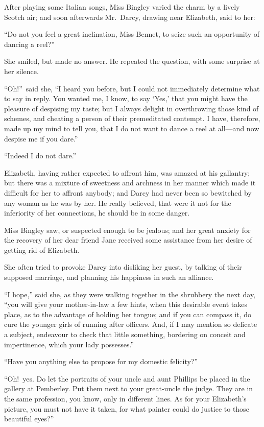 \documentclass[12pt,english]{book}
\begin{document}
After playing some Italian songs, Miss Bingley varied the charm by
a lively Scotch air; and soon afterwards Mr.\ Darcy, drawing near
Elizabeth, said to her:

{}``Do not you feel a great inclination, Miss Bennet, to seize such
an opportunity of dancing a reel?''\ 

She smiled, but made no answer. He repeated the question, with some
surprise at her silence.

{}``Oh!''\ said she, {}``I heard you before, but I could not immediately
determine what to say in reply. You wanted me, I know, to say `Yes,'
that you might have the pleasure of despising my taste; but I always
delight in overthrowing those kind of schemes, and cheating a person
of their premeditated contempt. I have, therefore, made up my mind
to tell you, that I do not want to dance a reel at all\mbox{---}and
now despise me if you dare.''

{}``Indeed I do not dare.''

Elizabeth, having rather expected to affront him, was amazed at his
gallantry; but there was a mixture of sweetness and archness in her
manner which made it difficult for her to affront anybody; and Darcy
had never been so bewitched by any woman as he was by her. He really
believed, that were it not for the inferiority of her connections,
he should be in some danger.

Miss Bingley saw, or suspected enough to be jealous; and her great
anxiety for the recovery of her dear friend Jane received some assistance
from her desire of getting rid of Elizabeth.

She often tried to provoke Darcy into disliking her guest, by talking
of their supposed marriage, and planning his happiness in such an
alliance.

{}``I hope,'' said she, as they were walking together in the shrubbery
the next day, {}``you will give your mother-in-law a few hints, when
this desirable event takes place, as to the advantage of holding her
tongue; and if you can compass it, do cure the younger girls of running
after officers. And, if I may mention so delicate a subject, endeavour
to check that little something, bordering on conceit and impertinence,
which your lady possesses.''

{}``Have you anything else to propose for my domestic felicity?''\ 

{}``Oh!\ yes. Do let the portraits of your uncle and aunt Phillips
be placed in the gallery at Pemberley. Put them next to your great-uncle
the judge. They are in the same profession, you know, only in different
lines. As for your Elizabeth's picture, you must not have it taken,
for what painter could do justice to those beautiful eyes?''\ 
\end{document}
